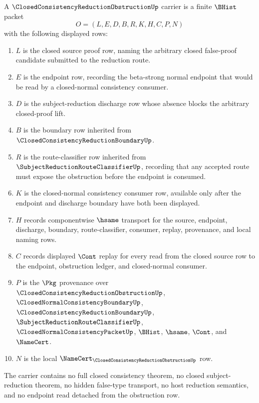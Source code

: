 \begin{definition}
\label{def:closed-consistency-reduction-obstruction-carrier}
A $\ClosedConsistencyReductionObstructionUp$ carrier is a finite $\BHist$ packet
$$
O=(L,E,D,B,R,K,H,C,P,N)
$$
with the following displayed rows:
\begin{enumerate}
\item $L$ is the closed source proof row, naming the arbitrary closed false-proof candidate submitted to the reduction route.
\item $E$ is the endpoint row, recording the beta-strong normal endpoint that would be read by a closed-normal consistency consumer.
\item $D$ is the subject-reduction discharge row whose absence blocks the arbitrary closed-proof lift.
\item $B$ is the boundary row inherited from $\ClosedConsistencyReductionBoundaryUp$.
\item $R$ is the route-classifier row inherited from $\SubjectReductionRouteClassifierUp$, recording that any accepted route must expose the obstruction before the endpoint is consumed.
\item $K$ is the closed-normal consistency consumer row, available only after the endpoint and discharge boundary have both been displayed.
\item $H$ records componentwise $\hsame$ transport for the source, endpoint, discharge, boundary, route-classifier, consumer, replay, provenance, and local naming rows.
\item $C$ records displayed $\Cont$ replay for every read from the closed source row to the endpoint, obstruction ledger, and closed-normal consumer.
\item $P$ is the $\Pkg$ provenance over $\ClosedConsistencyReductionObstructionUp$, $\ClosedNormalConsistencyBoundaryUp$, $\ClosedConsistencyReductionBoundaryUp$, $\SubjectReductionRouteClassifierUp$, $\ClosedNormalConsistencyPacketUp$, $\BHist$, $\hsame$, $\Cont$, and $\NameCert$.
\item $N$ is the local $\NameCert_{\ClosedConsistencyReductionObstructionUp}$ row.
\end{enumerate}
The carrier contains no full closed consistency theorem, no closed subject-reduction theorem, no hidden false-type transport, no host reduction semantics, and no endpoint read detached from the obstruction row.
\end{definition}

